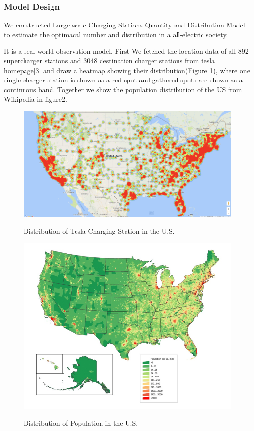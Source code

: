 \documentclass{mcmthesis}
\begin{document}
			\subsubsection{Model Design}
	We constructed Large-scale Charging Stations Quantity and Distribution Model to estimate the optimacal number and distribution in a all-electric society. 
	\par
	It is a real-world observation model. First We fetched the location data of all 892 supercharger stations and 3048 destination charger stations from tesla homepage[3] and draw a heatmap showing their distribution(Figure 1), where one single charger station is shown as a red spot and gathered spots are shown as a continuous band. Together we show the population distribution of the US from Wikipedia in figure2.
		\begin{figure}[htbp]
		\centering
		\includegraphics[width=15cm]{img/hotus.png}\\
		\caption{Distribution of Tesla Charging Station in the U.S.}\label{Figure1}
	\end{figure}

\begin{figure}[htbp]
	\centering
	\includegraphics[width=15cm]{img/popus.png}\\
		\caption{Distribution of Population in the U.S.}
	\label{Figure2}
\end{figure}
\end{document}
